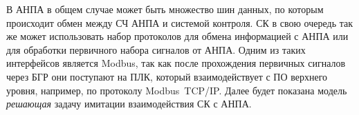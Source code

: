 В АНПА в общем случае может быть множество шин данных, по которым происходит обмен между СЧ АНПА и системой контроля.
СК в свою очередь так же может использовать набор протоколов для обмена информацией с АНПА
или для обработки первичного набора сигналов от АНПА.
Одним из таких интерфейсов является Modbus, так как после прохождения первичных сигналов через БГР
они поступают на ПЛК, который взаимодействует с ПО верхнего уровня, например, по протоколу Modbus~TCP/IP.
Далее будет показана модель \textit{решающая} задачу имитации взаимодействия СК с АНПА.
